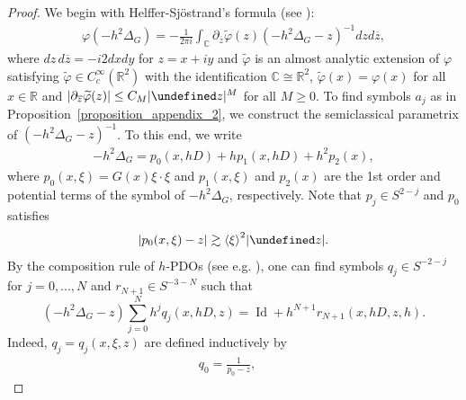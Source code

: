 \documentclass[10pt%
]{amsart}
\numberwithin{equation}{section}
\let\Im=\undefined\DeclareMathOperator*{\Im}{Im}
\newcommand{\R}{\mathbb{R}}
\newcommand{\C}{\mathbb{C}}
\def\Id{\mathop{\mathrm{Id}}\nolimits}
\theoremstyle{definition}
\def\<{{\langle}}
\def\>{{\rangle}}
\def\supp{\mathop{\mathrm{supp}}\nolimits}
\begin{document}
\begin{proof}
	We begin with Helffer-Sj\"ostrand's formula (see \cite[Section 8]{DiSj}): 
	\begin{align*}
		\varphi(-h^2\Delta_G)=-\frac{1}{2\pi i}\int_{\C}\partial_{\overline z}\widetilde\varphi(z)(-h^2\Delta_G-z)^{-1}d z d\overline z,
	\end{align*}
	where $dz\,d\overline z=-i2dxdy$ for $z=x+iy$ and $\widetilde \varphi$ is an almost analytic extension of $\varphi$ satisfying $\widetilde \varphi\in C_c^\infty(\R^2)$ with the identification $\C\cong \R^2$, $\widetilde \varphi(x)= \varphi(x)$ for all $x\in \R$ and $|\partial_{\overline z}\widetilde \varphi(z)|\le C_M|\Im z|^M$ for all $M\ge0$. %
	To find symbols $a_j$ as in Proposition~\ref{proposition_appendix_2}, we construct the semiclassical parametrix of $(-h^2\Delta_G-z)^{-1}$. To this end, we write
	\begin{align}
		\label{proof_proposition_appendix_2_-1}
		-h^2\Delta_G%
		=p_0(x,hD)+hp_1(x,hD)+h^2p_2(x),
	\end{align}
	where $p_0(x,\xi)=G(x)\xi\cdot\xi$ and $p_1(x,\xi)$ and $p_2(x)$ are the 1st order and potential terms of the symbol of $-h^2\Delta_G$, respectively. Note that $p_j\in S^{2-j}$ and $p_0$ satisfies 
	\begin{align}
		\label{proof_proposition_appendix_2_0}
		|p_0(x,\xi)-z|\gtrsim \<\xi\>^2|\Im z|.
	\end{align}
	By the composition rule of $h$-PDOs (see e.g. \cite{DiSj}),  one can find symbols $q_j\in S^{-2-j}$ for $j=0,...,N$ and $r_{N+1}\in S^{-3-N}$ such that
	$$
	(-h^2\Delta_G-z)\sum_{j=0}^Nh^jq_j(x,hD,z)=\Id+h^{N+1}r_{N+1}(x,hD,z,h).
	$$
	Indeed, $q_j=q_j(x,\xi,z)$ are defined inductively by
	\begin{align*}
		q_0=\frac{1}{p_0-z},\quad

\end{align*}
\end{proof}
\end{document}
